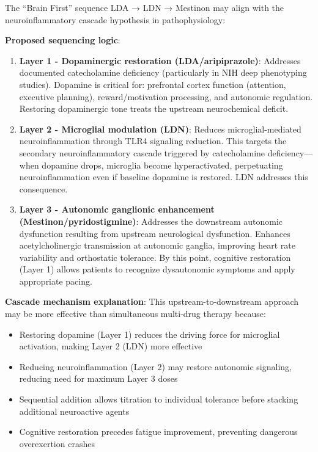 \begin{hypothesis}
\label{hyp:treatment-cascade-mechanism}

The ``Brain First'' sequence LDA → LDN → Mestinon may align with the neuroinflammatory cascade hypothesis in pathophysiology:

\textbf{Proposed sequencing logic}:
\begin{enumerate}
    \item \textbf{Layer 1 - Dopaminergic restoration (LDA/aripiprazole)}: Addresses documented catecholamine deficiency (particularly in NIH deep phenotyping studies). Dopamine is critical for: prefrontal cortex function (attention, executive planning), reward/motivation processing, and autonomic regulation. Restoring dopaminergic tone treats the upstream neurochemical deficit.

    \item \textbf{Layer 2 - Microglial modulation (LDN)}: Reduces microglial-mediated neuroinflammation through TLR4 signaling reduction. This targets the secondary neuroinflammatory cascade triggered by catecholamine deficiency---when dopamine drops, microglia become hyperactivated, perpetuating neuroinflammation even if baseline dopamine is restored. LDN addresses this consequence.

    \item \textbf{Layer 3 - Autonomic ganglionic enhancement (Mestinon/pyridostigmine)}: Addresses the downstream autonomic dysfunction resulting from upstream neurological dysfunction. Enhances acetylcholinergic transmission at autonomic ganglia, improving heart rate variability and orthostatic tolerance. By this point, cognitive restoration (Layer 1) allows patients to recognize dysautonomic symptoms and apply appropriate pacing.
\end{enumerate}

\textbf{Cascade mechanism explanation}:
This upstream-to-downstream approach may be more effective than simultaneous multi-drug therapy because:
\begin{itemize}
    \item Restoring dopamine (Layer 1) reduces the driving force for microglial activation, making Layer 2 (LDN) more effective
    \item Reducing neuroinflammation (Layer 2) may restore autonomic signaling, reducing need for maximum Layer 3 doses
    \item Sequential addition allows titration to individual tolerance before stacking additional neuroactive agents
    \item Cognitive restoration precedes fatigue improvement, preventing dangerous overexertion crashes
\end{itemize}


\end{hypothesis}
